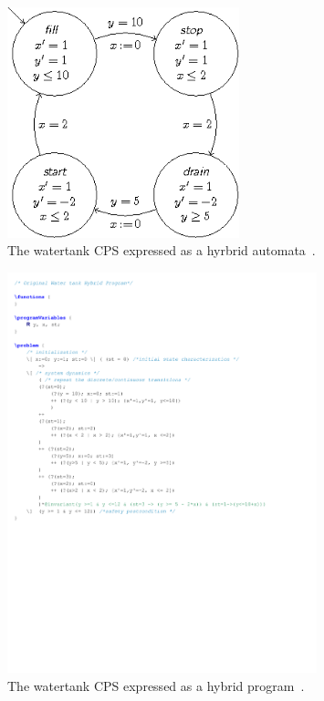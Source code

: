\begin{figure}
	\centering
	\includegraphics[width=0.6\textwidth]{images/watertank_ha}
	\caption{The watertank CPS expressed as a hyrbrid automata~\cite{keymaeraGuide}.}
	\label{fig:watertank_ha}
\end{figure}

\begin{figure}
	\centering
	\includegraphics[width=0.8\textwidth]{images/watertank_hp}
	\caption{The watertank CPS expressed as a hybrid program~\cite{keymaeraGuide}.}
	\label{fig:watertank_hp}
\end{figure}


